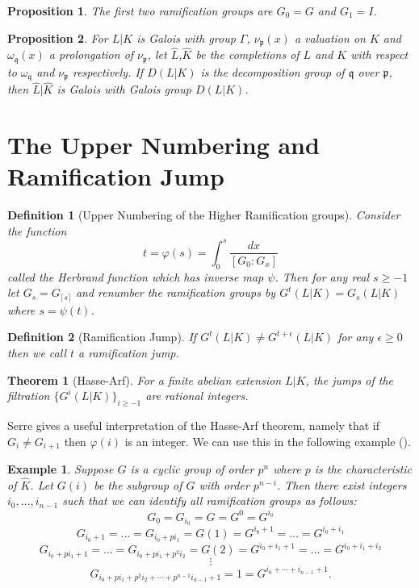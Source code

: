 \documentclass[paper=a4, fontsize=11pt]{scrartcl} %
\numberwithin{equation}{section} %
\numberwithin{figure}{section} %
\numberwithin{table}{section} %
\theoremstyle{break}
\newtheorem{defn}{Definition}
\newtheorem{thm}{Theorem}
\newtheorem{prop}{Proposition}
\newtheorem{ex}{Example}
\begin{document}
\begin{prop}
The first two ramification groups are $G_{0} = G$ and $G_{1}=I$.
\end{prop}

\begin{prop}
For $L|K$ is Galois with group $\Gamma$, $\nu_\mathfrak{p}(x)$ a valuation on $K$ and $\omega_\mathfrak{q}(x)$ a prolongation of $\nu_\mathfrak{p}$, let $\widehat{L}$,$\widehat{K}$ be the completions of $L$ and $K$ with respect to $\omega_\mathfrak{q}$ and $\nu_\mathfrak{p}$ respectively. If $D(L|K)$ is the decomposition group of $\mathfrak{q}$ over $\mathfrak{p}$, then $\widehat{L}|\widehat{K}$ is Galois with Galois group $D(L|K)$.
\end{prop}

\section{The Upper Numbering and Ramification Jump}

\begin{defn}[Upper Numbering of the Higher Ramification groups]
Consider the function
$$
t = \varphi(s) = \int_{0}^{s} \frac{dx}{[G_0 : G_x]}
$$
called the Herbrand function which has inverse map $\psi$.
Then for any real $s \geq -1$ let $G_s = G_{\lceil s \rceil}$ and renumber the ramification groups by $G^t(L|K) = G_s(L|K)$ where $s=\psi(t)$. 
\end{defn}
\begin{defn}[Ramification Jump]
If $G^{t}(L|K) \not=G^{t+\epsilon}(L|K)$ for any $\epsilon \geq 0$ then we call $t$ a ramification jump.
\end{defn}

\begin{thm}[Hasse-Arf]
For a finite abelian extension $L|K$, the jumps of the filtration $\{G^{i}(L|K)\}_{i \geq -1}$ are rational integers.
\end{thm}
Serre gives a useful interpretation of the Hasse-Arf theorem, namely that if $G_i \not= G_{i+1}$ then $\varphi(i)$ is an integer. We can use this in the following example (\cite{Serre}).

\begin{ex}
Suppose $G$ is a cyclic group of order $p^n$ where $p$ is the characteristic of $\widehat{K}$. Let $G(i)$ be the subgroup of $G$ with order $p^{n-i}$. Then there exist integers $i_0, \ldots,i_{n-1}$ such that we can identify all ramification groups as follows:
$$G_0 = G_{i_0} = G = G^0 = G^{i_0}$$
$$G_{{i_0}+1} = \ldots = G_{{i_0}+pi_1} = G(1) = G^{i_0+1} = \ldots = G^{i_0 + i_1}$$
$$G_{{i_0}+pi_1+1} = \ldots = G_{{i_0}+pi_1+p^2 i_2} = G(2) = G^{i_0+i_1+1} = \ldots = G^{i_0 + i_1+i_2}$$
$$\vdots$$
$$G_{i_0+pi_1+p^2 i_2 + \cdots + p^{n-1}i_{n-1} +1}={1}=G^{i_0+\cdots+i_{n-1}+1}.$$
\end{ex}
\end{document}
